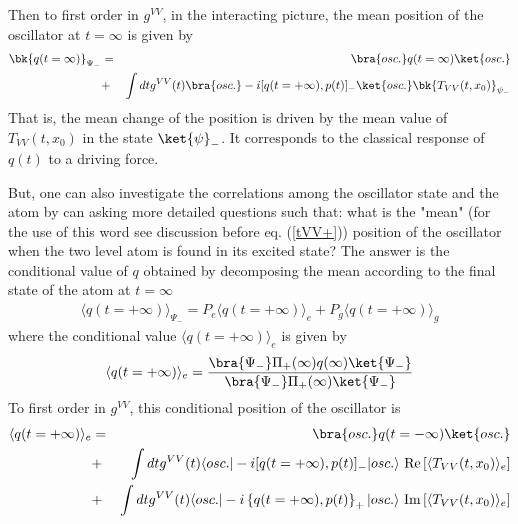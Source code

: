 \documentclass[12pt]{article}
\begin{document}
Then to first order in
$g^{VV}$, in the interacting picture, the mean position of the oscillator
at $t=\infty$ is given by
\begin{eqnarray}
\bk{q(t=\infty)}_{\Psi_-} &=& \bra{osc.}q(t=\infty) \ket{osc.}
\nonumber\\
&+&
\int dt  g^{VV}(t)
\bra{osc.} -i[q(t=+\infty),p(t)]_- \ket{osc.} \bk{T_{VV}(t,x_0)}_{{\psi}_-}
\nonumber\\
\label{meanchange}
\end{eqnarray}
That is, the mean change of the position is driven by the mean value
of $T_{VV}(t,x_0)$ in the state $\ket{\psi}_-$.
It corresponds to the classical response of $q(t)$ to a driving force.

But, one can also
investigate the correlations among the oscillator state and the
atom by can asking more detailed questions such that:
what is the "mean" (for the use of this
word see discussion before eq.
(\ref{tVV+}))
position of the oscillator when the two level atom is found in its excited
state?
The answer is the conditional value of $q$ obtained by
decomposing the mean according to the final state of the atom at
$t=\infty$
\begin{eqnarray}
\langle q(t=+\infty) \rangle_{{\Psi}_-} = P_e
\langle q(t=+\infty) \rangle_e + P_g
\langle q(t=+\infty) \rangle_g
\label{oo13}
\end{eqnarray}
where the conditional value $\langle q(t=+\infty) \rangle_e$ is given by
\begin{equation}
\langle q(t=+\infty) \rangle_e = { \bra{\Psi_-} \Pi_+(\infty) q(\infty)
\ket{\Psi_-} \over \bra{\Psi_-} \Pi_+(\infty) \ket{\Psi_- }}
\label{qe}
\end{equation}
To first order in
$g^{VV}$, this conditional  position of the oscillator is
\begin{eqnarray}
\langle q(t=+\infty) \rangle_e
&=& \bra{osc.}q(t=-\infty) \ket{osc.}
\nonumber\\
&+&
\int dt  g^{VV}(t)
\langle osc.
\vert -i[q(t=+\infty),p(t)]_-\vert osc.\rangle
\mbox{ Re} \left[ \langle T_{VV}(t,x_0)\rangle_e\right]
\nonumber\\
&+&
\int dt  g^{VV}(t) \langle osc.
\vert -i\left \{q(t=+\infty),p(t)\right\}_+\vert
osc.\rangle
\mbox{ Im} \left[\langle T_{VV}(t,x_0)\rangle_e\right]
\nonumber\\
\label{ootwelve}
\end{eqnarray}
\end{document}
